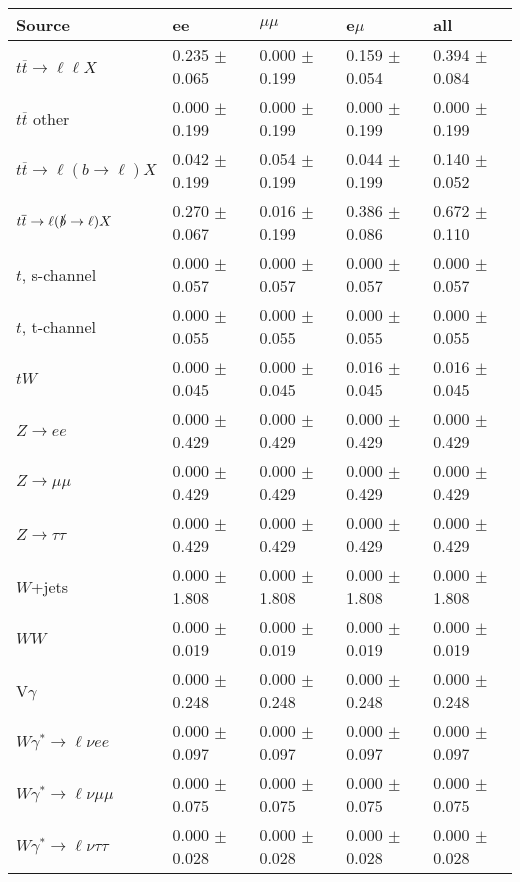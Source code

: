 \begin{tabular}{l | l l l l}
\hline\hline
 Source  &  ee  &  $\mu\mu$  &  e$\mu$  &  all \\
\hline
$t\overline{t}\rightarrow \ell\ell X$ &  0.235 $\pm$  0.065 &  0.000 $\pm$  0.199 &  0.159 $\pm$  0.054 &  0.394 $\pm$  0.084\\
$t\overline{t}$ other &  0.000 $\pm$  0.199 &  0.000 $\pm$  0.199 &  0.000 $\pm$  0.199 &  0.000 $\pm$  0.199\\
$t\overline{t}\rightarrow \ell(b\rightarrow \ell)X$ &  0.042 $\pm$  0.199 &  0.054 $\pm$  0.199 &  0.044 $\pm$  0.199 &  0.140 $\pm$  0.052\\
$t\overline{t}\rightarrow \ell(\slashed{b}\rightarrow \ell)X$ &  0.270 $\pm$  0.067 &  0.016 $\pm$  0.199 &  0.386 $\pm$  0.086 &  0.672 $\pm$  0.110\\
\hline
$t$, s-channel &  0.000 $\pm$  0.057 &  0.000 $\pm$  0.057 &  0.000 $\pm$  0.057 &  0.000 $\pm$  0.057\\
$t$, t-channel &  0.000 $\pm$  0.055 &  0.000 $\pm$  0.055 &  0.000 $\pm$  0.055 &  0.000 $\pm$  0.055\\
$tW$ &  0.000 $\pm$  0.045 &  0.000 $\pm$  0.045 &  0.016 $\pm$  0.045 &  0.016 $\pm$  0.045\\
\hline
$Z\rightarrow ee$ &  0.000 $\pm$  0.429 &  0.000 $\pm$  0.429 &  0.000 $\pm$  0.429 &  0.000 $\pm$  0.429\\
$Z\rightarrow\mu\mu$ &  0.000 $\pm$  0.429 &  0.000 $\pm$  0.429 &  0.000 $\pm$  0.429 &  0.000 $\pm$  0.429\\
$Z\rightarrow\tau\tau$ &  0.000 $\pm$  0.429 &  0.000 $\pm$  0.429 &  0.000 $\pm$  0.429 &  0.000 $\pm$  0.429\\
$W$+jets &  0.000 $\pm$  1.808 &  0.000 $\pm$  1.808 &  0.000 $\pm$  1.808 &  0.000 $\pm$  1.808\\
$WW$ &  0.000 $\pm$  0.019 &  0.000 $\pm$  0.019 &  0.000 $\pm$  0.019 &  0.000 $\pm$  0.019\\
\hline
V$\gamma$ &  0.000 $\pm$  0.248 &  0.000 $\pm$  0.248 &  0.000 $\pm$  0.248 &  0.000 $\pm$  0.248\\
$W\gamma^{*}\rightarrow\ell\nu e e$ &  0.000 $\pm$  0.097 &  0.000 $\pm$  0.097 &  0.000 $\pm$  0.097 &  0.000 $\pm$  0.097\\
$W\gamma^{*}\rightarrow\ell\nu\mu\mu$ &  0.000 $\pm$  0.075 &  0.000 $\pm$  0.075 &  0.000 $\pm$  0.075 &  0.000 $\pm$  0.075\\
$W\gamma^{*}\rightarrow\ell\nu\tau\tau$ &  0.000 $\pm$  0.028 &  0.000 $\pm$  0.028 &  0.000 $\pm$  0.028 &  0.000 $\pm$  0.028\\

\end{tabular}
